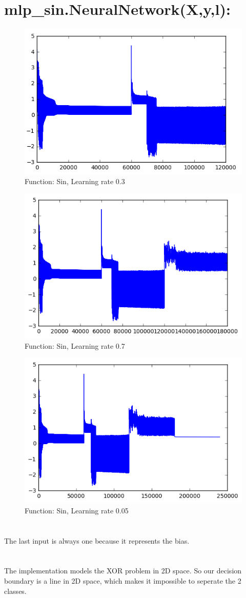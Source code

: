 \documentclass[11pt]{article}
\newcommand{\exercise}{\section{}}
\begin{document}
\section*{mlp\_sin.NeuralNetwork(X,y,l):}
\begin{figure}[H]
	\centering
	\includegraphics[width=0.7\linewidth]{sin_lr03}
	\caption{Function: Sin, Learning rate 0.3}
	\label{fig:sinlr03}
\end{figure}
\begin{figure}[H]
	\centering
	\includegraphics[width=0.7\linewidth]{sin_lr07}
	\caption{Function: Sin, Learning rate 0.7}
	\label{fig:sinlr07}
\end{figure}
\begin{figure}[H]
	\centering
	\includegraphics[width=0.7\linewidth]{sin_lr005}
	\caption{Function: Sin, Learning rate 0.05}
	\label{fig:sinlr005}
\end{figure}

\exercise
The last input is always one because it represents the bias.

\exercise
The implementation models the XOR problem in 2D space. So our decision boundary is a line in 2D space, which makes it impossible to seperate the 2 classes.
\end{document}
